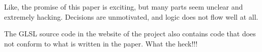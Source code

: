 \documentclass[10pt]{article}
\begin{document}
  Like, the promise of this paper is exciting, but many parts seem unclear and extremely hacking. Decisions are unmotivated, and logic does not flow well at all.

  The GLSL source code in the website of the project also contains code that does not conform to what is written in the paper. What the heck!!!


  
    
\end{document}
